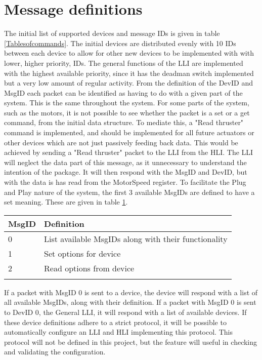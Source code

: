 \section{Message definitions}
The initial list of supported devices and message IDs is given in table \ref{Tablesofcommands}. The initial devices are distributed evenly with 10 IDs between each device to allow for other new devices to be implemented with with lower, higher priority, IDs. The general functions of the LLI are implemented with the highest available priority, since it has the deadman switch implemented but a very low amount of regular activity.
From the definition of the DevID and MsgID each packet can be identified as having to do with a given part of the system. This is the same throughout the system. For some parts of the system, such as the motors, it is not possible to see whether the packet is a set or a get command, from the initial data structure. To mediate this, a "Read thruster" command is implemented, and should be implemented for all future actuators or other devices which are not just passively feeding back data. This would be achieved by sending a "Read thruster" packet to the LLI from the HLI. The LLI will neglect the data part of this message, as it unnecessary to understand the intention of the package. It will then respond with the MsgID and  DevID, but with the data is has read from the MotorSpeed register.
To facilitate the Plug and Play nature of the system, the first 3 available MsgIDs are defined to have a set meaning. These are given in table \ref{firstmsgids}.
\begin{table}[h]
\centering
\begin{tabular}{ll}
\toprule
\textbf{MsgID} & \textbf{Definition}\\
\midrule
0 & List available MsgIDs along with their functionality\\
1 & Set options for device\\
2 & Read options from device\\
\bottomrule
\label{firstmsgids}
\end{tabular}
\end{table}
 If a packet with MsgID 0 is sent to a device, the device will respond with a list of all available MsgIDs, along with their definition. If a packet with MsgID 0 is sent to DevID 0, the General LLI, it will respond with a list of available devices. If these device definitions adhere to a strict protocol, it will be possible to automatically configure an LLI and HLI implementing this protocol. This protocol will not be defined in this project, but the feature will useful in checking and validating the configuration.
 
